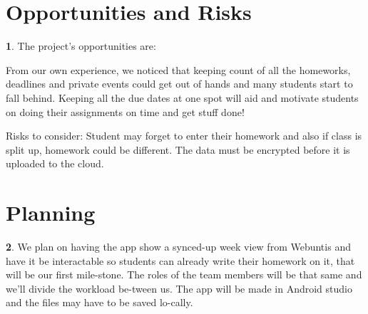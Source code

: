 \documentclass[12pt]{article}
\theoremstyle{definition}
\newtheorem{ourVersion}{ \linebreak}
\begin{document}
\pagebreak
\section{Opportunities and Risks}

 \begin{ourVersion}

The project’s opportunities are:

From our own experience, we noticed that keeping count of all the homeworks, deadlines and private events could get out of hands and many students start to fall behind. Keeping all the due dates at one spot will aid and motivate students on doing their assignments on time and get stuff done! 

Risks to consider: 
Student may forget to enter their homework and also if class is split up, homework could be different. The data must be encrypted before it is uploaded to the cloud.
	
 \end{ourVersion}


\pagebreak
\section{Planning}

\begin{ourVersion}
We plan on having the app show a synced-up week view from Webuntis and have it be interactable 
so students can already write their homework on it, that will be our first mile-stone. 
The roles of the team members will be that same and we’ll divide the workload be-tween us. 
The app will be made in Android studio and the files may have to be saved lo-cally.
\end{ourVersion}
\end{document}
